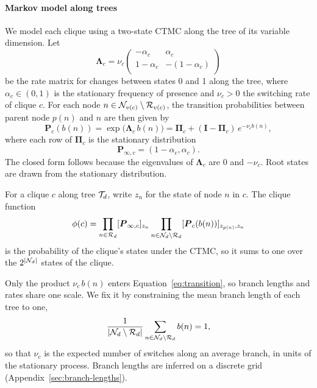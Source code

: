 \documentclass[
11pt, %
oneside, %
english, %
singlespacing, %
headsepline, %
chapterinoneline, %
]{MastersDoctoralThesis} %
\def\bLambda{\boldsymbol{\Lambda}}
\def\bP{\boldsymbol{P}}
\def\bPi{\boldsymbol{\Pi}}
\def\N{{\cal N}}
\def\R{{\cal R}}
\def\T{{\cal T}}
\begin{document}
\paragraph{Markov model along trees} We model each clique using a two-state CTMC along the tree of its variable dimension. Let
\begin{equation}
	\bLambda_c = \nu_c
	\begin{pmatrix}
		-\alpha_c  & \alpha_c    \\
		1-\alpha_c & -(1-\alpha_c) \\
	\end{pmatrix}
\end{equation}
be the rate matrix for changes between states 0 and 1 along the tree, where $\alpha_c \in (0,1)$ is the stationary frequency of presence and $\nu_c > 0$ the switching rate of clique $c$. For each node $n \in \N_{v(c)} \setminus \R_{v(c)}$, the transition probabilities between parent node $p(n)$ and $n$ are then given by
\begin{equation}
	\label{eq:transition}
	\bP_c(b(n)) = \exp\!\big(\bLambda_c\, b(n)\big) = \bPi_c + (\boldsymbol{I} - \bPi_c)\, e^{-\nu_c b(n)},
\end{equation}
where each row of $\bPi_c$ is the stationary distribution
\begin{equation}
	\label{eq:stationary distribution}
	\bP_{\infty,c} = \left(1-\alpha_c, \alpha_c\right).
\end{equation}
The closed form follows because the eigenvalues of $\bLambda_c$ are $0$ and $-\nu_c$. Root states are drawn from the stationary distribution.

For a clique $c$ along tree $\T_d$, write $z_n$ for the state of node $n$ in $c$. The clique function
\begin{equation}
	\label{eq:clique}
	\phi(c) = \prod_{n \in \R_d} [\bP_{\infty,c}]_{z_n} \prod_{n \in \N_d \setminus \R_d} [\bP_c(b(n))]_{z_{p(n)}, z_n}
\end{equation}
is the probability of the clique's states under the CTMC, so it sums to one over the $2^{|\N_d|}$ states of the clique.

Only the product $\nu_c\, b(n)$ enters Equation~\eqref{eq:transition}, so branch lengths and rates share one scale. We fix it by constraining the mean branch length of each tree to one,
\begin{equation*}
	\frac{1}{|\N_d \setminus \R_d|} \sum_{n \in \N_d \setminus \R_d} b(n) = 1,
\end{equation*}
so that $\nu_c$ is the expected number of switches along an average branch, in units of the stationary process. Branch lengths are inferred on a discrete grid (Appendix~\ref{sec:branch-lengths}).
\end{document}
